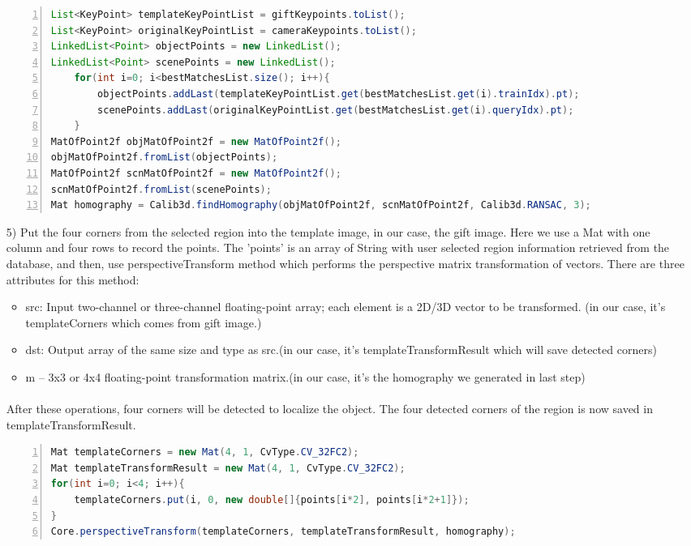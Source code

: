 \begin{enumerate}
\begin{lstlisting}[language={java},
        numbers=left,basicstyle=\small\ttfamily,breaklines=true] 
List<KeyPoint> templateKeyPointList = giftKeypoints.toList();
List<KeyPoint> originalKeyPointList = cameraKeypoints.toList();
LinkedList<Point> objectPoints = new LinkedList();
LinkedList<Point> scenePoints = new LinkedList();
    for(int i=0; i<bestMatchesList.size(); i++){
        objectPoints.addLast(templateKeyPointList.get(bestMatchesList.get(i).trainIdx).pt);
        scenePoints.addLast(originalKeyPointList.get(bestMatchesList.get(i).queryIdx).pt);
    }
MatOfPoint2f objMatOfPoint2f = new MatOfPoint2f();
objMatOfPoint2f.fromList(objectPoints);
MatOfPoint2f scnMatOfPoint2f = new MatOfPoint2f();
scnMatOfPoint2f.fromList(scenePoints);
Mat homography = Calib3d.findHomography(objMatOfPoint2f, scnMatOfPoint2f, Calib3d.RANSAC, 3);
\end{lstlisting} 
\item[5)] Put the four corners from the selected region into the template image, in our case, the gift image. Here we use a Mat with one column and four rows to record the points. The 'points' is an array of String with user selected region information retrieved from the database, and then, use perspectiveTransform method which performs the perspective matrix transformation of vectors. There are three attributes for this method: 
\begin{itemize}
\item src: Input two-channel or three-channel floating-point array; each element is a 2D/3D vector to be transformed. (in our case, it's templateCorners which comes from gift image.)
\item dst: Output array of the same size and type as src.(in our case, it's templateTransformResult which will save detected corners)
\item m – 3x3 or 4x4 floating-point transformation matrix.(in our case, it's the homography we generated in last step)
\end{itemize}
\paragraph{} After these operations, four corners will be detected to localize the object. The four detected corners of the region is now saved in templateTransformResult.
\begin{lstlisting}[language={java},
        numbers=left,basicstyle=\small\ttfamily,breaklines=true]
Mat templateCorners = new Mat(4, 1, CvType.CV_32FC2);
Mat templateTransformResult = new Mat(4, 1, CvType.CV_32FC2);
for(int i=0; i<4; i++){
    templateCorners.put(i, 0, new double[]{points[i*2], points[i*2+1]});
}
Core.perspectiveTransform(templateCorners, templateTransformResult, homography);
\end{lstlisting} 
\end{enumerate}
